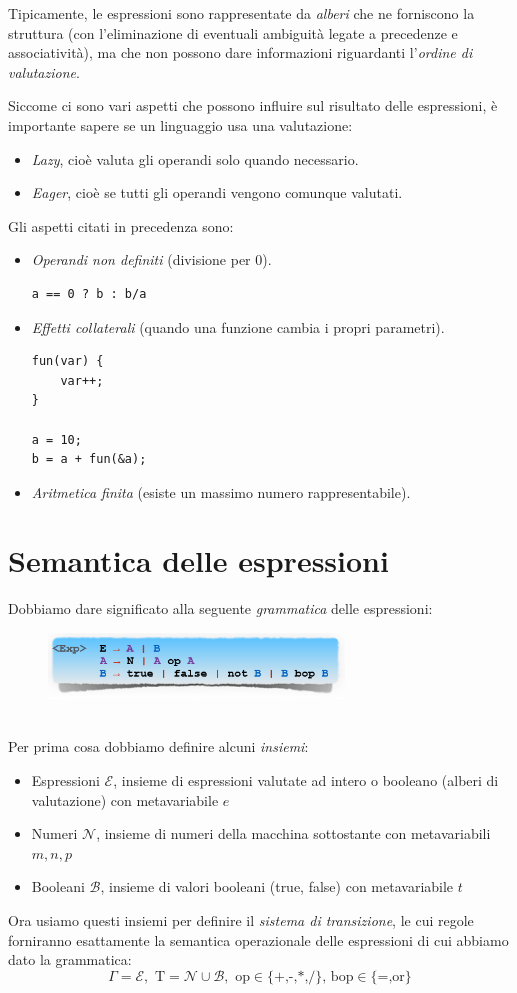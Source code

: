 \documentclass[a4paper,oneside,titlepage]{book}
\begin{document}
Tipicamente, le espressioni sono rappresentate da \textit{alberi} che ne forniscono la struttura (con l'eliminazione di eventuali ambiguità legate a precedenze e associatività), ma che non possono dare informazioni riguardanti l'\textit{ordine di valutazione}.

Siccome ci sono vari aspetti che possono influire sul risultato delle espressioni, è importante sapere se un linguaggio usa una valutazione:
\begin{itemize}
	\item \textit{Lazy}, cioè valuta gli operandi solo quando necessario.
	\item \textit{Eager}, cioè se tutti gli operandi vengono comunque valutati. 
\end{itemize}
Gli aspetti citati in precedenza sono:
\begin{itemize}
\item \textit{Operandi non definiti} (divisione per 0).
\begin{lstlisting}
a == 0 ? b : b/a
\end{lstlisting}
\item \textit{Effetti collaterali} (quando una funzione cambia i propri parametri).
\begin{lstlisting}
fun(var) {
	var++;
}

a = 10;
b = a + fun(&a);
\end{lstlisting}
\item \textit{Aritmetica finita} (esiste un massimo numero rappresentabile).
\end{itemize}

\section{Semantica delle espressioni}
Dobbiamo dare significato alla seguente \textit{grammatica} delle espressioni:
\begin{figure}[htp]
	\centering
	\includegraphics[width=0.7\textwidth]{exp.png}
\end{figure}
\\
Per prima cosa dobbiamo definire alcuni \textit{insiemi}:
\begin{itemize}
	\item Espressioni $\mathcal{E}$, insieme di espressioni valutate ad intero o booleano (alberi di valutazione) con metavariabile $e$
	\item Numeri $\mathcal{N}$, insieme di numeri della macchina sottostante con metavariabili $m, n, p$
	\item Booleani $\mathcal{B}$, insieme di valori booleani (true, false) con metavariabile $t$			
\end{itemize}
Ora usiamo questi insiemi per definire il \textit{sistema di transizione}, le cui regole forniranno esattamente la semantica operazionale delle espressioni di cui abbiamo dato la grammatica:
\[ \Gamma = \mathcal{E}, \text{ T} = \mathcal{N} \cup \mathcal{B}, \text{ op} \in \text{\{+,-,*,/\}, bop} \in \text{\{=,or\}} \]
\end{document}
